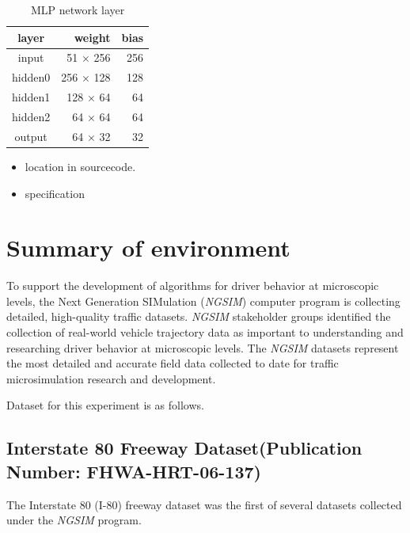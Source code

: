 \begin{table}[H]
\centering
\begin{tabular}{|c|r|r|}
\hline 
layer  & weight   & bias \\ \hline \hline
input  & 51 $\times$ 256 & 256  \\
hidden0 & 256 $\times$ 128 & 128 \\
hidden1 & 128 $\times$ 64  & 64  \\
hidden2 & 64 $\times$ 64   & 64  \\
output & 64 $\times$ 32   & 32  \\
\hline
\end{tabular} 
\caption{MLP network layer}
\label{tab:reward_mlp_network}
\end{table}



\begin{itemize}
\item location in sourcecode.
\item specification
\end{itemize}

\pagebreak
\section{Summary of environment}

To support the development of algorithms for driver behavior at microscopic levels, the Next Generation SIMulation ({\it NGSIM}) computer program is collecting detailed, high-quality traffic datasets. {\it NGSIM} stakeholder groups identified the collection of real-world vehicle trajectory data as important to understanding and researching driver behavior at microscopic levels. The {\it NGSIM} datasets represent the most detailed and accurate field data collected to date for traffic microsimulation research and development. 





Dataset for this experiment is as follows.


\subsection{Interstate 80 Freeway Dataset(Publication Number: FHWA-HRT-06-137)}

The Interstate 80 (I-80) freeway dataset was the first of several datasets collected under the {\it NGSIM} program.

